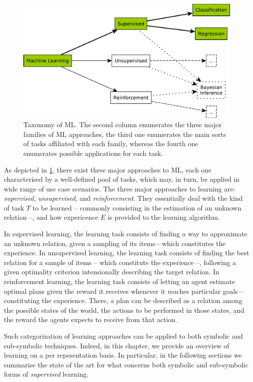 \documentclass[12pt,a4paper,openright,twoside]{book}
\begin{document}
\begin{figure}
    \centering
    \includegraphics[width=.8\linewidth]{figures/ml-taxonomy.pdf}
    \caption[Taxonomy of ML]{Taxonomy of ML. The second column enumerates the three major families of ML approaches, the third one enumerates the main sorts of tasks affiliated with each family, whereas the fourth one enumerates possible applications for each task.}
    \label{fig:ml-taxonomy}
\end{figure}
%
%
As depicted in \cref{fig:ml-taxonomy}, there exist three major approaches to ML, each one characterised by a well-defined pool of tasks, which may, in turn, be applied in wide range of use case scenarios.
%
The three major approaches to learning are: \emph{supervised}, \emph{unsupervised}, and \emph{reinforcement}.
%
They essentially deal with the kind of task $T$ to be learned -- commonly consisting in the estimation of an unknown relation --, and how expericence $E$ is provided to the learning algorithm.

In supervised learning, the learning task consists of finding a way to approximate an unknown relation, given a sampling of its items---which constitutes the experience.
%
In unsupervised learning, the learning task consists of finding the best relation for a sample of items -- which constitute the experience --, following a given optimality criterion intensionally describing the target relation.
%
In reinforcement learning, the learning task consists of letting an agent estimate optimal plans given the reward it receives whenever it reaches particular goals---constituting the experience.
%
There, a plan can be described as a relation among the possible states of the world, the actions to be performed in those states, and the reward the agents expects to receive from that action.

Such categorization of learning approaches can be applied to both symbolic and sub-symbolic techniques.
%
Indeed, in this chapter, we provide an overview of learning on a per repesentation basis.
%
In particular, in the following sections we summarise the state of the art for what concerns both symbolic and sub-symbolic forms of \emph{supervised} learning.
\end{document}
